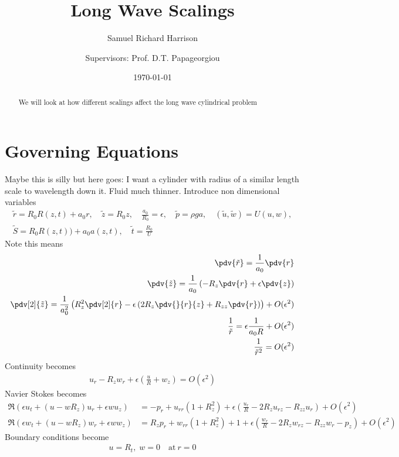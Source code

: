 \documentclass[12pt]{article}
\title{Long Wave Scalings}
\author[1,2]{Samuel Richard Harrison}
\author[2]{\authorcr Supervisors: Prof. D.T. Papageorgiou}
\affil[1]{ University of Reading}
\affil[2]{Imperial College London}
\date{\today}
\begin{document}
\maketitle

\begin{abstract}
We will look at how different scalings affect the long wave cylindrical problem
\end{abstract}
\section{Governing Equations}
Maybe this is silly but here goes: I want a cylinder with radius of a similar length scale to wavelength down it. Fluid much thinner.
Introduce non dimensional variables
\begin{align}\tilde r = R_0 R(z,t) + a_0 r, \quad \tilde z = R_0 z, \quad \frac{a_0}{R_0} = \epsilon, \quad \tilde p = \rho g a,\quad (\tilde u,\tilde w) = U(u,w), \\ \tilde S = R_0R(z,t)) + a_0a(z,t), \quad \tilde t =\frac{R_0}{U} \end{align}
Note this means 
\begin{align}
\pdv{\tilde r } = \frac{1}{a_0}\pdv{r}\\
\pdv{\tilde z} = \frac{1}{a_0}\left(-R_z\pdv{r}+\epsilon\pdv{z}\right)\\
\pdv[2]{\tilde z}= \frac{1}{a_0^2}\left(R_z^2\pdv[2]{r}-\epsilon\left(2R_z\pdv{}{r}{z}+R_{zz}\pdv{r}\right)\right) +O(\epsilon^2)\\
\frac{1}{\tilde r} = \epsilon\frac{1}{a_0R}+O(\epsilon^2)\\
\frac{1}{\tilde r^2} = O(\epsilon^2)
\end{align}
Continuity becomes
\begin{align}
u_r-R_z w_r + \epsilon\left(\frac{u}{R}+w_z\right) = O(\epsilon^2)
\end{align}
Navier Stokes becomes
\begin{align}
\Re\left(\epsilon u_t +(u-wR_z)u_r+\epsilon w u_z\right)&=-p_r+u_{rr}(1+R_z^2) + \epsilon\left(\frac{u_r}{R}-2R_zu_{rz}-R_{zz}u_r\right) + O(\epsilon^2)\\
\Re\left(\epsilon w_t +(u-wR_z)w_r+\epsilon w w_z\right)&=R_zp_r+w_{rr}(1+R_z^2) + 1 + \epsilon\left(\frac{w_r}{R}-2R_zw_{rz}-R_{zz}w_r-p_z\right) + O(\epsilon^2)
\end{align}
Boundary conditions become 
\begin{align}
u = R_t,\; w = 0\quad \mathrm{at}\: r= 0 
\end{align}
\end{document}
